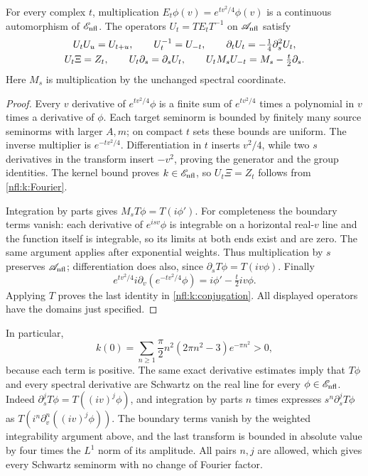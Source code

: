 \begin{proposition}
For every complex $t$, multiplication
$E_t\phi(v)=e^{tv^2/4}\phi(v)$ is a continuous automorphism of $\mathscr E_{\rm nfl}$.
The operators $U_t=TE_tT^{-1}$ on $\mathscr A_{\rm nfl}$ satisfy
\begin{gather}
U_tU_u=U_{t+u},\qquad U_t^{-1}=U_{-t},\qquad
\partial_tU_t=-\tfrac14\partial_s^2U_t,\notag\\
U_t\Xi=Z_t,\qquad U_t\partial_s=\partial_s U_t,\qquad
U_tM_sU_{-t}=M_s-\tfrac t2\partial_s. \label{nfl:k:conjugation}
\end{gather}
Here $M_s$ is multiplication by the unchanged spectral coordinate.
\end{proposition}
\begin{proof}
Every $v$ derivative of $e^{tv^2/4}\phi$ is a finite sum of
$e^{tv^2/4}$ times a polynomial in $v$ times a derivative of $\phi$.
Each target seminorm is bounded by finitely many source seminorms
with larger $A,m$; on compact $t$ sets these bounds are uniform.
The inverse multiplier is $e^{-tv^2/4}$. Differentiation in $t$
inserts $v^2/4$, while two $s$ derivatives in the transform insert
$-v^2$, proving the generator and the group identities.
The kernel bound proves $k\in\mathscr E_{\rm nfl}$, so $U_t\Xi=Z_t$ follows from
\eqref{nfl:k:Fourier}.

Integration by parts gives $M_sT\phi=T(i\phi')$.
For completeness the boundary terms vanish: each derivative of
$e^{isv}\phi$ is integrable on a horizontal real-$v$ line and the
function itself is integrable, so its limits at both ends exist and
are zero. The same argument applies after exponential weights.
Thus multiplication by $s$ preserves $\mathscr A_{\rm nfl}$; differentiation does also,
since $\partial_sT\phi=T(iv\phi)$.
Finally
\[
e^{tv^2/4}i\partial_v(e^{-tv^2/4}\phi)
   =i\phi'-\tfrac t2iv\phi.
\]
Applying $T$ proves the last identity in \eqref{nfl:k:conjugation}.
All displayed operators have the domains just specified.
\end{proof}


In particular,
\[
 k(0)=\sum_{n\ge1}\frac{\pi}{2}n^2(2\pi n^2-3)e^{-\pi n^2}>0,
\]
because each term is positive. The same exact derivative estimates imply
that $T\phi$ and every spectral derivative are Schwartz on the real line
for every $\phi\in\mathscr E_{\rm nfl}$. Indeed
$\partial_s^jT\phi=T((iv)^j\phi)$, and integration by parts $n$ times
expresses $s^n\partial_s^jT\phi$ as
$T(i^n\partial_v^n((iv)^j\phi))$. The boundary terms vanish by the
weighted integrability argument above, and the last transform is
bounded in absolute value by four times the $L^1$ norm of its
amplitude. All pairs $n,j$ are allowed, which gives every Schwartz
seminorm with no change of Fourier factor.

